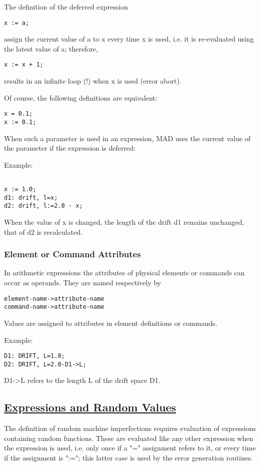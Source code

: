 The definition of the deferred expression  
\begin{verbatim}
x := a;
\end{verbatim} 
assign the current value of a to x every time x is used, i.e. it is
re-evaluated using the latest value of a; therefore,  
\begin{verbatim}
x := x + 1;
\end{verbatim} 
results in an infinite loop (!) when x is used (error abort). 

Of course, the following definitions are equivalent:  
\begin{verbatim}
x = 0.1;
x := 0.1;
\end{verbatim}

When such a parameter is used in an expression, MAD uses the current
value of the parameter if the expression is deferred:  

Example: 
\begin{verbatim}

x := 1.0;
d1: drift, l=x;
d2: drift, l:=2.0 - x;
\end{verbatim} 
When the value of x is changed, the length of the drift d1 remains
unchanged, that of d2 is recalculated.   

\subsubsection{Element or Command Attributes} 
In arithmetic expressions the attributes of physical elements or
commands can occur as operands. They are named respectively by  
\begin{verbatim}
element-name->attribute-name
command-name->attribute-name
\end{verbatim} 

Values are assigned to attributes in element definitions or commands. 

Example: 
\begin{verbatim}
D1: DRIFT, L=1.0;
D2: DRIFT, L=2.0-D1->L;
\end{verbatim} 
D1-\textgreater L refers to the length L of the drift space D1.  

\subsection{\href{defer}{Expressions and Random Values}} 
\label{subsec:expr_rnd}
The definition of random machine imperfections requires evaluation of
expressions containing random functions. These are evaluated like any
other expression when the expression is used, i.e. only once if a "="
assignment refers to it, or every time if the assignment is ":="; this
latter case is used by the error generation routines.  

